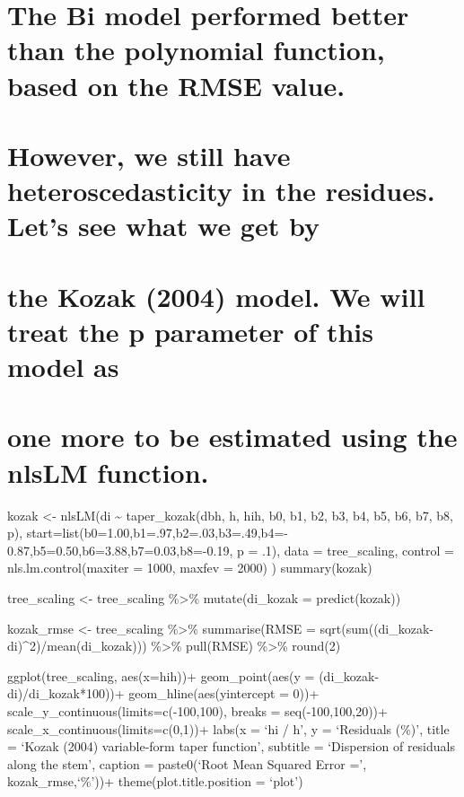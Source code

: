 \documentclass[
]{article}
\begin{document}
\hypertarget{the-bi-model-performed-better-than-the-polynomial-function-based-on-the-rmse-value.}{%
\section{The Bi model performed better than the polynomial function,
based on the RMSE
value.}\label{the-bi-model-performed-better-than-the-polynomial-function-based-on-the-rmse-value.}}

\hypertarget{however-we-still-have-heteroscedasticity-in-the-residues.-lets-see-what-we-get-by}{%
\section{However, we still have heteroscedasticity in the residues.
Let's see what we get
by}\label{however-we-still-have-heteroscedasticity-in-the-residues.-lets-see-what-we-get-by}}

\hypertarget{the-kozak-2004-model.-we-will-treat-the-p-parameter-of-this-model-as}{%
\section{\texorpdfstring{\adjusting the Kozak (2004) model. We will
treat the p parameter of this model
as}{the Kozak (2004) model. We will treat the p parameter of this model as}}\label{the-kozak-2004-model.-we-will-treat-the-p-parameter-of-this-model-as}}

\hypertarget{one-more-to-be-estimated-using-the-nlslm-function.}{%
\section{one more to be estimated using the nlsLM
function.}\label{one-more-to-be-estimated-using-the-nlslm-function.}}

kozak \textless- nlsLM(di \textasciitilde{} taper\_kozak(dbh, h, hih,
b0, b1, b2, b3, b4, b5, b6, b7, b8, p),
start=list(b0=1.00,b1=.97,b2=.03,b3=.49,b4=-
0.87,b5=0.50,b6=3.88,b7=0.03,b8=-0.19, p = .1), data = tree\_scaling,
control = nls.lm.control(maxiter = 1000, maxfev = 2000) ) summary(kozak)

tree\_scaling \textless- tree\_scaling \%\textgreater\% mutate(di\_kozak
= predict(kozak))

kozak\_rmse \textless- tree\_scaling \%\textgreater\% summarise(RMSE =
sqrt(sum((di\_kozak-di)\^{}2)/mean(di\_kozak))) \%\textgreater\%
pull(RMSE) \%\textgreater\% round(2)

ggplot(tree\_scaling, aes(x=hih))+ geom\_point(aes(y =
(di\_kozak-di)/di\_kozak*100))+ geom\_hline(aes(yintercept = 0))+
scale\_y\_continuous(limits=c(-100,100), breaks = seq(-100,100,20))+
scale\_x\_continuous(limits=c(0,1))+ labs(x = `hi / h', y = `Residuals
(\%)', title = `Kozak (2004) variable-form taper function', subtitle =
`Dispersion of residuals along the stem', caption = paste0(`Root Mean
Squared Error =', kozak\_rmse,`\%'))+ theme(plot.title.position =
`plot')
\end{document}

